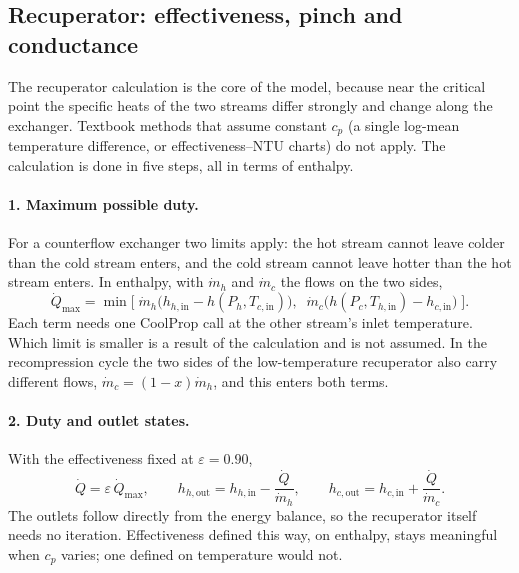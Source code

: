 
\subsection{Recuperator: effectiveness, pinch and conductance}
The recuperator calculation is the core of the model, because near the critical point the specific heats of the two streams differ strongly and change along the exchanger. Textbook methods that assume constant $c_p$ (a single log-mean temperature difference, or effectiveness--NTU charts) do not apply. The calculation is done in five steps, all in terms of enthalpy.

\paragraph{1. Maximum possible duty.} For a counterflow exchanger two limits apply: the hot stream cannot leave colder than the cold stream enters, and the cold stream cannot leave hotter than the hot stream enters. In enthalpy, with $\dot m_h$ and $\dot m_c$ the flows on the two sides,
\begin{equation}
\dot Q_\mathrm{max} = \min\Big[\;\dot m_h\big(h_{h,\mathrm{in}} - h(P_h, T_{c,\mathrm{in}})\big),\;\; \dot m_c\big(h(P_c, T_{h,\mathrm{in}}) - h_{c,\mathrm{in}}\big)\;\Big].
\end{equation}
Each term needs one CoolProp call at the other stream's inlet temperature. Which limit is smaller is a result of the calculation and is not assumed. In the recompression cycle the two sides of the low-temperature recuperator also carry different flows, $\dot m_c = (1-x)\dot m_h$, and this enters both terms.

\paragraph{2. Duty and outlet states.} With the effectiveness fixed at $\varepsilon = 0.90$,
\begin{equation}
\dot Q = \varepsilon\, \dot Q_\mathrm{max}, \qquad h_{h,\mathrm{out}} = h_{h,\mathrm{in}} - \frac{\dot Q}{\dot m_h}, \qquad h_{c,\mathrm{out}} = h_{c,\mathrm{in}} + \frac{\dot Q}{\dot m_c}.
\end{equation}
The outlets follow directly from the energy balance, so the recuperator itself needs no iteration. Effectiveness defined this way, on enthalpy, stays meaningful when $c_p$ varies; one defined on temperature would not.

